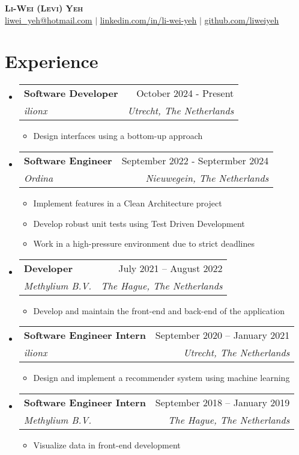 \documentclass[letterpaper,11pt]{article}
\makeatletter
\newcommand{\resumeItem}[1]{
	\item\small{
		{#1 \vspace{-2pt}}
	}
}
\newcommand{\resumeSubheading}[4]{
	\vspace{4pt}\item
	\begin{tabular*}{0.97\textwidth}[t]{l@{\extracolsep{\fill}}r}
		\textbf{#1} & #2 \\
		\textit{\small#3} & \textit{\small #4} \\
	\end{tabular*}\vspace{-7pt}
}
\newcommand{\resumeSubHeadingListStart}{\begin{itemize}[leftmargin=0.15in, label={}]}
\newcommand{\resumeSubHeadingListEnd}{\end{itemize}}
\newcommand{\resumeItemListStart}{\begin{itemize}}
\newcommand{\resumeItemListEnd}{\end{itemize}\vspace{-5pt}}
\makeatother
\begin{document}
	
	\begin{center}
		\textbf{\Huge \scshape Li-Wei (Levi) Yeh} \\ \vspace{1pt}
		\small \href{mailto:liwei_yeh@hotmail.com}{\underline{liwei\_yeh@hotmail.com}} $|$ 
		\href{https://www.linkedin.com/in/li-wei-yeh/}{\underline{linkedin.com/in/li-wei-yeh}} $|$
		\href{https://github.com/LiWeiYeh/}{\underline{github.com/liweiyeh}}
	\end{center}
	
	
	
	\section{Experience}
	\resumeSubHeadingListStart
	
   	\resumeSubheading
    {Software Developer}{October 2024 - Present}
    {ilionx}{Utrecht, The Netherlands}
    \resumeItemListStart
    \resumeItem{Design interfaces using a bottom-up approach}
    \resumeItemListEnd
    
	\resumeSubheading
	{Software Engineer}{September 2022 - Septermber 2024}
	{Ordina}{Nieuwegein, The Netherlands}
	\resumeItemListStart
    \resumeItem{Implement features in a Clean Architecture project}
    \resumeItem{Develop robust unit tests using Test Driven Development}
   	\resumeItem{Work in a high-pressure environment due to strict deadlines}
	\resumeItemListEnd
	
	\resumeSubheading
	{Developer}{July 2021 – August 2022}
	{Methylium B.V.}{The Hague, The Netherlands}
	\resumeItemListStart
	\resumeItem{Develop and maintain the front-end and back-end of the application}
	\resumeItemListEnd
	
	\resumeSubheading
	{Software Engineer Intern}{September 2020 -- January 2021}
	{ilionx}{Utrecht, The Netherlands}
	\resumeItemListStart
	\resumeItem{Design and implement a recommender system using machine learning}
	\resumeItemListEnd
	
	\resumeSubheading
	{Software Engineer Intern}{September 2018 -- January 2019}
	{Methylium B.V.}{The Hague, The Netherlands}
	\resumeItemListStart
	\resumeItem{Visualize data in front-end development}
	\resumeItemListEnd
	
	\resumeSubHeadingListEnd
	
	
	
\end{document}
